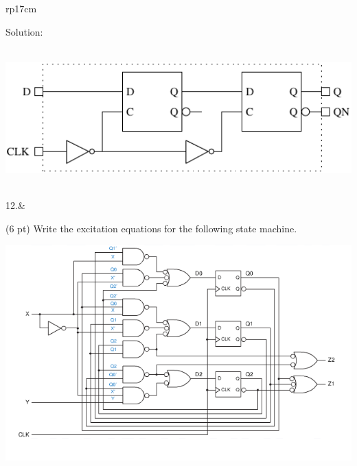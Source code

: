 \documentclass{article}
\begin{document}
\begin{longtable}[l]{rp{17cm}}
\begin{minipage}[t]{\linewidth}
Solution: \\ \\
\begin{center}
  \includegraphics{../LatchesAndFlipFlops/Assessments/DFlipFlopLogic}
\end{center}
\end{minipage}\\
\medskip
12.&\begin{minipage}[t]{\linewidth}(6 pt) Write the excitation equations for the following state machine.
\begin{center}
  \includegraphics[scale=0.7]{../StateMachines/Assessments/Wakerly_7_43}
\end{center}


\end{minipage}
\end{longtable}
\end{document}
